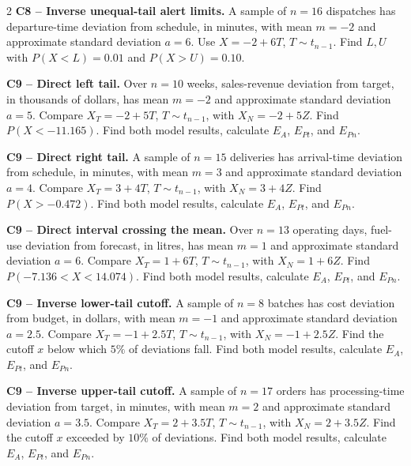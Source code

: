 \begin{multicols}{2}
\textbf{C8 -- Inverse unequal-tail alert limits.} A sample of $n=16$ dispatches has departure-time deviation from schedule, in minutes, with mean $m=-2$ and approximate standard deviation $a=6$. Use $X=-2+6T$, $T\sim t_{n-1}$.
Find $L,U$ with $P(X<L)=0.01$ and $P(X>U)=0.10$. 

\textbf{C9 -- Direct left tail.} Over $n=10$ weeks, sales-revenue deviation from target, in thousands of dollars, has mean $m=-2$ and approximate standard deviation $a=5$. Compare $X_T=-2+5T$, $T\sim t_{n-1}$, with $X_N=-2+5Z$.
Find $P(X<-11.165)$. Find both model results, calculate $E_A$, $E_{Pt}$, and $E_{Pn}$. 

\textbf{C9 -- Direct right tail.} A sample of $n=15$ deliveries has arrival-time deviation from schedule, in minutes, with mean $m=3$ and approximate standard deviation $a=4$. Compare $X_T=3+4T$, $T\sim t_{n-1}$, with $X_N=3+4Z$.
Find $P(X>-0.472)$. Find both model results, calculate $E_A$, $E_{Pt}$, and $E_{Pn}$. 

\textbf{C9 -- Direct interval crossing the mean.} Over $n=13$ operating days, fuel-use deviation from forecast, in litres, has mean $m=1$ and approximate standard deviation $a=6$. Compare $X_T=1+6T$, $T\sim t_{n-1}$, with $X_N=1+6Z$.
Find $P(-7.136<X<14.074)$. Find both model results, calculate $E_A$, $E_{Pt}$, and $E_{Pn}$. 

\textbf{C9 -- Inverse lower-tail cutoff.} A sample of $n=8$ batches has cost deviation from budget, in dollars, with mean $m=-1$ and approximate standard deviation $a=2.5$. Compare $X_T=-1+2.5T$, $T\sim t_{n-1}$, with $X_N=-1+2.5Z$.
Find the cutoff $x$ below which $5\%$ of deviations fall. Find both model results, calculate $E_A$, $E_{Pt}$, and $E_{Pn}$. 

\textbf{C9 -- Inverse upper-tail cutoff.} A sample of $n=17$ orders has processing-time deviation from target, in minutes, with mean $m=2$ and approximate standard deviation $a=3.5$. Compare $X_T=2+3.5T$, $T\sim t_{n-1}$, with $X_N=2+3.5Z$.
Find the cutoff $x$ exceeded by $10\%$ of deviations. Find both model results, calculate $E_A$, $E_{Pt}$, and $E_{Pn}$. 


\end{multicols}
